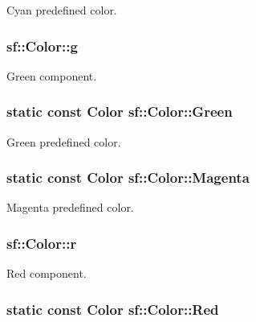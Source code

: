 Cyan predefined color. 

\hypertarget{classsf_1_1_color_a591daf9c3c55dea830c76c962d6ba1a5}{
\subsubsection[{g}]{ sf\-::\-Color\-::g}}\label{classsf_1_1_color_a591daf9c3c55dea830c76c962d6ba1a5}


Green component. 

\hypertarget{classsf_1_1_color_a71bdec1f240038ee66fc8f3b418fce71}{
\subsubsection[{Green}]{\setlength{\rightskip}{0pt plus 5cm}static {\bf const} {\bf Color} sf\-::\-Color\-::\-Green\hspace{0.3cm}{\ttfamily [static]}}}\label{classsf_1_1_color_a71bdec1f240038ee66fc8f3b418fce71}


Green predefined color. 

\hypertarget{classsf_1_1_color_a9ee8537b23a72bff51d8f20f4894519e}{
\subsubsection[{Magenta}]{\setlength{\rightskip}{0pt plus 5cm}static {\bf const} {\bf Color} sf\-::\-Color\-::\-Magenta\hspace{0.3cm}{\ttfamily [static]}}}\label{classsf_1_1_color_a9ee8537b23a72bff51d8f20f4894519e}


Magenta predefined color. 

\hypertarget{classsf_1_1_color_a6a5256ca24a4f9f0e0808f6fc23e01e1}{
\subsubsection[{r}]{ sf\-::\-Color\-::r}}\label{classsf_1_1_color_a6a5256ca24a4f9f0e0808f6fc23e01e1}


Red component. 

\hypertarget{classsf_1_1_color_a7052b1c5408a953e25f9691e0e828c9d}{
\subsubsection[{Red}]{\setlength{\rightskip}{0pt plus 5cm}static {\bf const} {\bf Color} sf\-::\-Color\-::\-Red\hspace{0.3cm}{\ttfamily [static]}}}\label{classsf_1_1_color_a7052b1c5408a953e25f9691e0e828c9d}


